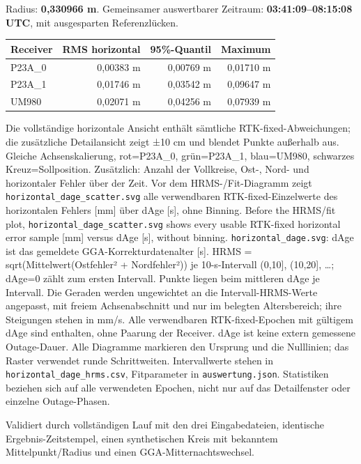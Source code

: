 \documentclass[11pt,a4paper]{article}
\begin{document}
Radius: \textbf{0,330966 m}. Gemeinsamer auswertbarer Zeitraum: \textbf{03:41:09–08:15:08 UTC}, mit ausgesparten Referenzlücken.

\begin{center}\small\begin{tabular}{lrrr}\toprule
Receiver & RMS horizontal & 95\%-Quantil & Maximum\\\midrule
P23A\_0 & 0,00383 m & 0,00769 m & 0,01710 m\\
P23A\_1 & 0,01746 m & 0,03542 m & 0,09647 m\\
UM980 & 0,02071 m & 0,04256 m & 0,07939 m\\
\bottomrule\end{tabular}\end{center}

Die vollständige horizontale Ansicht enthält sämtliche RTK-fixed-Abweichungen; die zusätzliche Detailansicht zeigt ±10 cm und blendet Punkte außerhalb aus. Gleiche Achsenskalierung, rot=P23A\_0, grün=P23A\_1, blau=UM980, schwarzes Kreuz=Sollposition. Zusätzlich: Anzahl der Vollkreise, Ost-, Nord- und horizontaler Fehler über der Zeit. Vor dem HRMS-/Fit-Diagramm zeigt {\small\texttt{horizontal\_\allowbreak{}dage\_\allowbreak{}scatter.svg}} alle verwendbaren RTK-fixed-Einzelwerte des horizontalen Fehlers [mm] über dAge [s], ohne Binning. Before the HRMS/fit plot, {\small\texttt{horizontal\_\allowbreak{}dage\_\allowbreak{}scatter.svg}} shows every usable RTK-fixed horizontal error sample [mm] versus dAge [s], without binning. {\small\texttt{horizontal\_\allowbreak{}dage.svg}}: dAge ist das gemeldete GGA-Korrekturdatenalter [s]. HRMS = sqrt(Mittelwert(Ostfehler² + Nordfehler²)) je 10-s-Intervall (0,10], (10,20], …; dAge=0 zählt zum ersten Intervall. Punkte liegen beim mittleren dAge je Intervall. Die Geraden werden ungewichtet an die Intervall-HRMS-Werte angepasst, mit freiem Achsenabschnitt und nur im belegten Altersbereich; ihre Steigungen stehen in mm/s. Alle verwendbaren RTK-fixed-Epochen mit gültigem dAge sind enthalten, ohne Paarung der Receiver. dAge ist keine extern gemessene Outage-Dauer. Alle Diagramme markieren den Ursprung und die Nulllinien; das Raster verwendet runde Schrittweiten. Intervallwerte stehen in {\small\texttt{horizontal\_\allowbreak{}dage\_\allowbreak{}hrms.csv}}, Fitparameter in {\small\texttt{auswertung.json}}. Statistiken beziehen sich auf alle verwendeten Epochen, nicht nur auf das Detailfenster oder einzelne Outage-Phasen.

Validiert durch vollständigen Lauf mit den drei Eingabedateien, identische Ergebnis-Zeitstempel, einen synthetischen Kreis mit bekanntem Mittelpunkt/Radius und einen GGA-Mitternachtswechsel.
\end{document}

